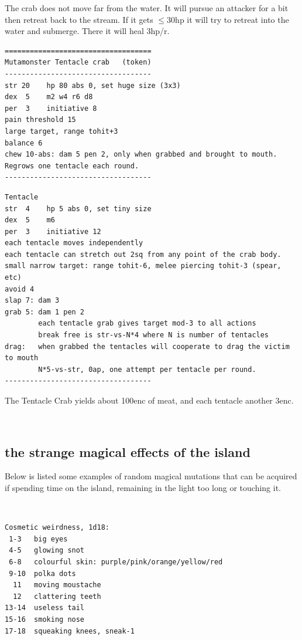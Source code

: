 \begin{description}
The crab does not move far from the water. It will pursue an attacker for a bit then retreat back to the stream. If it gets $\leq$30hp it will try to retreat into the water and submerge. There it will heal 3hp/r.
\goodbreak \small \begin{samepage} \begin{verbatim}
===================================
Mutamonster Tentacle crab   (token)
-----------------------------------
str 20    hp 80 abs 0, set huge size (3x3)
dex  5    m2 w4 r6 d8
per  3    initiative 8
pain threshold 15
large target, range tohit+3
balance 6
chew 10-abs: dam 5 pen 2, only when grabbed and brought to mouth.
Regrows one tentacle each round.
-----------------------------------
\end{verbatim} \end{samepage} \goodbreak \begin{samepage} \begin{verbatim}
Tentacle
str  4    hp 5 abs 0, set tiny size
dex  5    m6
per  3    initiative 12
each tentacle moves independently
each tentacle can stretch out 2sq from any point of the crab body.
small narrow target: range tohit-6, melee piercing tohit-3 (spear, etc)
avoid 4
slap 7: dam 3
grab 5: dam 1 pen 2
        each tentacle grab gives target mod-3 to all actions
        break free is str-vs-N*4 where N is number of tentacles
drag:   when grabbed the tentacles will cooperate to drag the victim to mouth
        N*5-vs-str, 0ap, one attempt per tentacle per round.
-----------------------------------
\end{verbatim} \end{samepage} \normalsize 
The Tentacle Crab yields about 100enc of meat, and each tentacle another 3enc.

\end{description}

\


\subsection*{the strange magical effects of the island}
\label{appendixmagicisland}

\raggedbottom

Below is listed some examples of random magical mutations that can be acquired if spending time on the island, remaining in the light too long or touching it.

\

\goodbreak \small \begin{samepage} \begin{verbatim}
Cosmetic weirdness, 1d18:
 1-3   big eyes
 4-5   glowing snot
 6-8   colourful skin: purple/pink/orange/yellow/red
 9-10  polka dots
  11   moving moustache
  12   clattering teeth
13-14  useless tail
15-16  smoking nose
17-18  squeaking knees, sneak-1
\end{verbatim} \end{samepage} \normalsize


